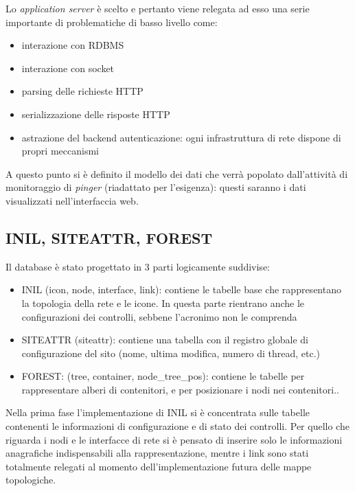 \documentclass[a4wide,10pt,italian]{manual}
\begin{document}
Lo \emph{application server} è scelto e pertanto viene relegata ad esso
una serie importante di problematiche di basso livello come:
\begin{itemize}
\item {} 
interazione con RDBMS

\item {} 
interazione con socket

\item {} 
parsing delle richieste HTTP

\item {} 
serializzazione delle risposte HTTP

\item {} 
astrazione del backend autenticazione: ogni infrastruttura di rete dispone di propri meccanismi

\end{itemize}

A questo punto si è definito il modello dei dati che verrà popolato dall'attività di monitoraggio
di \emph{pinger} (riadattato per l'esigenza): questi saranno i dati visualizzati nell'interfaccia web.


\subsection{INIL, SITEATTR, FOREST}

Il database è stato progettato in 3 parti logicamente suddivise:
\begin{itemize}
\item {} 
INIL (icon, node, interface, link): contiene le tabelle base che
rappresentano la topologia della rete e le icone. In questa parte
rientrano anche le configurazioni dei controlli, sebbene l'acronimo non le comprenda

\item {} 
SITEATTR (siteattr): contiene una tabella con il registro globale di configurazione del
sito (nome, ultima modifica, numero di thread, etc.)

\item {} 
FOREST: (tree, container, node\_tree\_pos): contiene le tabelle per
rappresentare alberi di contenitori, e per posizionare i nodi nei contenitori..

\end{itemize}

Nella prima fase l'implementazione di INIL si è concentrata sulle
tabelle contenenti le informazioni di configurazione e di stato dei controlli. Per quello che riguarda
i nodi e le interfacce di rete si è pensato di inserire solo le informazioni anagrafiche indispensabili
alla rappresentazione, mentre i link sono stati totalmente relegati al momento dell'implementazione futura delle mappe topologiche.
\end{document}
